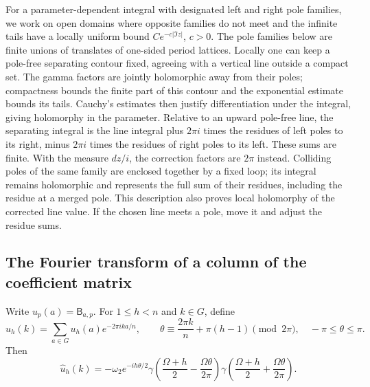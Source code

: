 For a parameter-dependent integral with designated left and right pole
families, we work on open domains where opposite families do not meet
and the infinite tails have a locally uniform bound $Ce^{-c|\Im z|}$,
$c>0$. The pole families below are finite unions of translates of
one-sided period lattices. Locally one can keep a pole-free separating
contour fixed, agreeing with a vertical line outside a compact set.
The gamma factors are jointly holomorphic away from their poles;
compactness bounds the finite part of this contour and the exponential
estimate bounds its tails. Cauchy's estimates then justify
differentiation under the integral, giving holomorphy in the parameter.
Relative to an upward pole-free line, the separating
integral is the line integral plus $2\pi i$ times the residues of
left poles to its right, minus $2\pi i$ times the residues of right
poles to its left. These sums are finite. With the measure $dz/i$,
the correction factors are $2\pi$ instead.
Colliding poles of the same family are enclosed together by a fixed
loop; its integral remains holomorphic and represents the full sum
of their residues, including the residue at a merged pole. This
description also proves local holomorphy of the corrected line value.
If the chosen line meets a pole, move it and adjust the residue sums.

\subsection{The Fourier transform of a column of the coefficient matrix}
\begin{lemma}\label{foundation:column-fourier}
Write $u_p(a)=\mathsf B_{a,p}$. For $1\leq h<n$ and $k\in G$, define
\[
 \widehat u_h(k)=\sum_{a\in G}u_h(a)e^{-2\pi ika/n},
 \qquad
 \theta\equiv\frac{2\pi k}{n}+\pi(h-1)\pmod{2\pi},
 \quad -\pi\leq\theta\leq\pi.
\]
Then
\begin{equation}\label{fd:fourier}
 \widehat u_h(k)
 =-\omega_2 e^{-ih\theta/2}
   \gamma\left(\frac{\Omega+h}{2}-\frac{\Omega\theta}{2\pi}\right)
   \gamma\left(\frac{\Omega+h}{2}+\frac{\Omega\theta}{2\pi}\right).
\end{equation}
\end{lemma}

